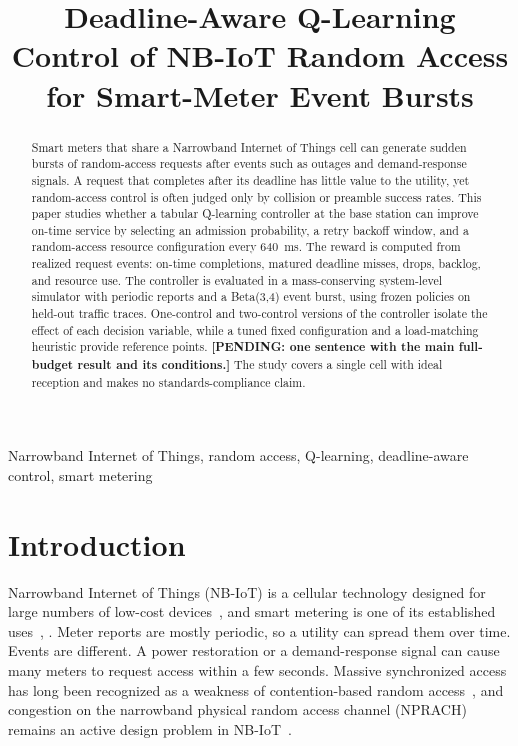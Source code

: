 \documentclass[conference]{IEEEtran}
\newif\ifblind
\newcommand{\pending}[1]{\textbf{[PENDING: #1]}}
\begin{document}
\title{Deadline-Aware Q-Learning Control of NB-IoT Random Access for
Smart-Meter Event Bursts}

\ifblind
\author{}
\else
\author{
}
\fi

\maketitle

\begin{abstract}
Smart meters that share a Narrowband Internet of Things cell can generate
sudden bursts of random-access requests after events such as outages and
demand-response signals. A request that completes after its deadline has little
value to the utility, yet random-access control is often judged only by
collision or preamble success rates. This paper studies whether a tabular
Q-learning controller at the base station can improve on-time service by
selecting an admission probability, a retry backoff window, and a
random-access resource configuration every 640~ms. The reward is computed from
realized request events: on-time completions, matured deadline misses, drops,
backlog, and resource use. The controller is evaluated in a mass-conserving
system-level simulator with periodic reports and a Beta(3,4) event burst, using
frozen policies on held-out traffic traces. One-control and two-control versions
of the controller isolate the effect of each decision variable, while a tuned
fixed configuration and a load-matching heuristic provide reference points.
\pending{one sentence with the main full-budget result and its conditions.}
The study covers a single cell with ideal reception and makes no
standards-compliance claim.
\end{abstract}

\begin{IEEEkeywords}
Narrowband Internet of Things, random access, Q-learning, deadline-aware
control, smart metering
\end{IEEEkeywords}

\section{Introduction}
Narrowband Internet of Things (NB-IoT) is a cellular technology designed for
large numbers of low-cost devices~\cite{wang}, and smart metering is one of its
established uses~\cite{stusek}, \cite{abbas}. Meter reports are mostly periodic,
so a utility can spread them over time. Events are different. A power restoration
or a demand-response signal can cause many meters to request access within a few
seconds. Massive synchronized access has long been recognized as a weakness of
contention-based random access~\cite{laya}, and congestion on the narrowband physical
random access channel (NPRACH) remains an active design problem in
NB-IoT~\cite{iiyambo}.
\end{document}
